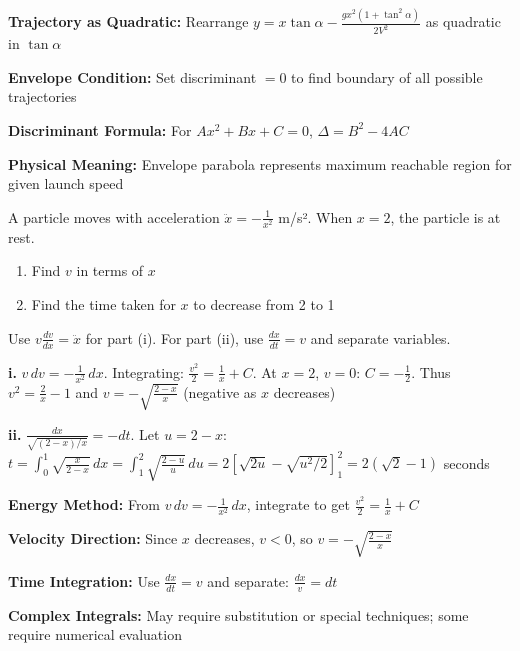 \begin{takeaways}
\item \textbf{Trajectory as Quadratic:} Rearrange $y = x\tan\alpha - \frac{gx^2(1+\tan^2\alpha)}{2V^2}$ as quadratic in $\tan\alpha$
\item \textbf{Envelope Condition:} Set discriminant $= 0$ to find boundary of all possible trajectories
\item \textbf{Discriminant Formula:} For $Ax^2 + Bx + C = 0$, $\Delta = B^2 - 4AC$
\item \textbf{Physical Meaning:} Envelope parabola represents maximum reachable region for given launch speed
\end{takeaways}

\begin{problem}
A particle moves with acceleration $\ddot{x} = -\frac{1}{x^2}$ m/s². When $x = 2$, the particle is at rest.
\begin{enumerate}[label=\textbf{\roman*.}]
    \item Find $v$ in terms of $x$
    \item Find the time taken for $x$ to decrease from 2 to 1
\end{enumerate}
\end{problem}

\begin{hint}
Use $v\frac{dv}{dx} = \ddot{x}$ for part (i). For part (ii), use $\frac{dx}{dt} = v$ and separate variables.
\end{hint}

\begin{solution}
\textbf{i.} $v\,dv = -\frac{1}{x^2}\,dx$. Integrating: $\frac{v^2}{2} = \frac{1}{x} + C$. At $x=2$, $v=0$: $C = -\frac{1}{2}$. Thus $v^2 = \frac{2}{x} - 1$ and $v = -\sqrt{\frac{2-x}{x}}$ (negative as $x$ decreases)

\textbf{ii.} $\frac{dx}{\sqrt{(2-x)/x}} = -dt$. Let $u = 2-x$: $t = \int_0^1 \sqrt{\frac{x}{2-x}}\,dx = \int_1^2 \sqrt{\frac{2-u}{u}}\,du = 2[\sqrt{2u} - \sqrt{u^2/2}]_1^2 = 2(\sqrt{2} - 1)$ seconds
\end{solution}

\begin{takeaways}
\item \textbf{Energy Method:} From $v\,dv = -\frac{1}{x^2}\,dx$, integrate to get $\frac{v^2}{2} = \frac{1}{x} + C$
\item \textbf{Velocity Direction:} Since $x$ decreases, $v < 0$, so $v = -\sqrt{\frac{2-x}{x}}$
\item \textbf{Time Integration:} Use $\frac{dx}{dt} = v$ and separate: $\frac{dx}{v} = dt$
\item \textbf{Complex Integrals:} May require substitution or special techniques; some require numerical evaluation
\end{takeaways}

